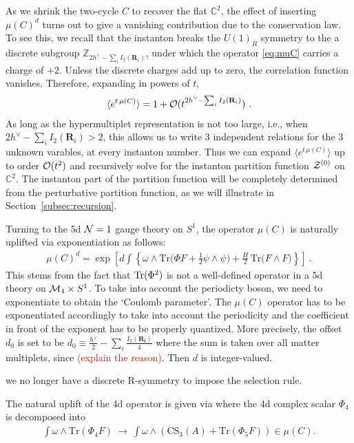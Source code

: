 \documentclass[letterpaper, 11pt]{article}
\def\IC{\mathbb{C}}
\def\IZ{\mathbb{Z}}
\def\CM{{\cal M}}
\def\CN{{\cal N}}
\def\CO{{\cal O}}
\def\CZ{{\cal Z}}
\def\Tr{{\rm Tr}}
\begin{document}
As we shrink the two-cycle $C$ to recover the flat $\IC^2$, the effect of  inserting $\mu(C)^d$ turns out to give a vanishing contribution due to the conservation law. To see this, we recall that the instanton breaks the $U(1)_R$ symmetry to the a discrete subgroup $\IZ_{2h^\vee - \sum_i I_2(\mathbf{R}_i)}$, under which the operator \eqref{eq:muC} carries a charge of $+2$. Unless the discrete charges add up to zero, the correlation function vanishes. Therefore, expanding in powers of $t$, 
\begin{align}
  \label{eq:donaldson-4d}
  \langle e^{t \, \mu(C)}\rangle = 1 + \CO(t^{2h^\vee - \sum_i I_2(\mathbf{R}_i)})  \ . 
\end{align}
As long as the hypermultiplet representation is not too large, i.e., when $2h^\vee - \sum_i I_2(\mathbf{R}_i) > 2$, this allows us to write 3 independent relations for the 3 unknown varables, at every instanton number. Thus we can expand $\langle e^{t \, \mu(C)}\rangle$ up to order $\CO(t^2)$ and recursively solve for the instanton partition function $\CZ^{(0)}$ on $\IC^2$. The instanton part of the partition function will be completely determined from the perturbative partition function, as we will illustrate in Section~\ref{subsec:recursion}. 

Turning to the 5d $\CN=1$ gauge theory on $S^1$, the operator $\mu(C)$ is naturally uplifted via exponentiation as follows: \cite{Baulieu:1997nj}
\begin{align} \label{eq:muC}
  \mu(C)^d = \exp\left[
    d\int \left\{ \omega \wedge \text{Tr}\Big(\Phi F + \tfrac{1}{2} \psi \wedge \psi\Big) + \tfrac{H}{2}\, \text{Tr}\Big( F \wedge F \Big) \right\}
     \right] \ .
\end{align}
This stems from the fact that $\Tr (\Phi^2)$ is not a well-defined operator in a 5d theory on $ \CM_4 \times S^1$.
To take into account the periodicty boson, we need to exponentiate to obtain the `Coulomb parameter'. The $\mu(C)$ operator has to be exponentiated accordingly to take into account the periodicity and the coefficient in front of the exponent has to be properly quantized. More precisely, the offset $d_0$ is set to be $d_0 \equiv \frac{h^\vee}{2} - \sum_{i} \frac{I_2(\mathbf{R_i})}{4}$ where the sum is taken over all matter multiplets, since \textcolor{red}{(explain the reason)}. Then $d$ is integer-valued.  


we no longer have a discrete R-symmetry to impose the selection rule. 


The natural uplift of the 4d operator 
is given via  
where the 4d complex scalar $\Phi_4$ is decomposed into
\begin{align}
  \int\omega \wedge \text{Tr}(\Phi_4 F) \ \longrightarrow \
  \int\omega \wedge \left(\text{CS}_3(A) + \text{Tr}(\Phi_5 F) \right) \in \mu(C).
\end{align}
\end{document}
